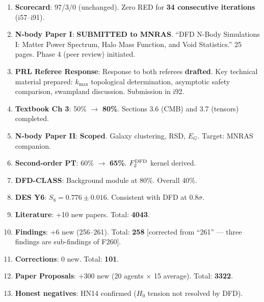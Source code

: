 \documentclass[11pt,a4paper]{article}
\begin{document}
\begin{tcolorbox}[colback=green!5!white, colframe=dfdgreen, title=\textbf{i91 Operational Results}]
\begin{enumerate}[nosep]
\item \textbf{Scorecard}: 97/3/0 (unchanged). Zero RED for \textbf{34 consecutive iterations} (i57--i91).

\item \textbf{N-body Paper I}: \textbf{SUBMITTED to MNRAS}. ``DFD N-Body Simulations I: Matter Power Spectrum, Halo Mass Function, and Void Statistics.'' 25 pages. Phase 4 (peer review) initiated.

\item \textbf{PRL Referee Response}: Response to both referees \textbf{drafted}. Key technical material prepared: $k_{\max}$ topological determination, asymptotic safety comparison, swampland discussion. Submission in i92.

\item \textbf{Textbook Ch 3}: 50\% $\to$ \textbf{80\%}. Sections 3.6 (CMB) and 3.7 (tensors) completed.

\item \textbf{N-body Paper II}: \textbf{Scoped}. Galaxy clustering, RSD, $E_G$. Target: MNRAS companion.

\item \textbf{Second-order PT}: 60\% $\to$ \textbf{65\%}. $F_2^{\rm DFD}$ kernel derived.

\item \textbf{DFD-CLASS}: Background module at 80\%. Overall 40\%.

\item \textbf{DES Y6}: $S_8 = 0.776 \pm 0.016$. Consistent with DFD at $0.8\sigma$.

\item \textbf{Literature}: +10 new papers. Total: \textbf{4043}.

\item \textbf{Findings}: +6 new (256--261). Total: \textbf{258} [corrected from ``261'' --- three findings are sub-findings of F260].

\item \textbf{Corrections}: 0 new. Total: \textbf{101}.

\item \textbf{Paper Proposals}: +300 new (20 agents $\times$ 15 average). Total: \textbf{3322}.

\item \textbf{Honest negatives}: HN14 confirmed ($H_0$ tension not resolved by DFD).
\end{enumerate}
\end{tcolorbox}
\end{document}
